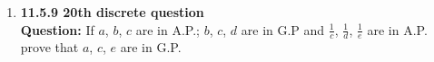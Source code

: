 \documentclass{article}
\begin{document}
\begin{enumerate}


\item \textbf{ 11.5.9 20th discrete question}\\
\textbf{Question:} 
If $a$, $b$, $c$ are in A.P.; $b$, $c$, $d$ are in G.P and $\frac{1}{c}$, $\frac{1}{d}$, $\frac{1}{e}$ are in A.P. prove that $a$, $c$, $e$ are in G.P.\\


\end{enumerate}
\end{document}
